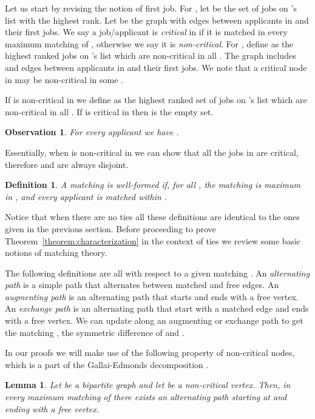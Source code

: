 \documentclass[11pt]{article}
\newtheorem{lemma}{Lemma}
\newtheorem{definition}{Definition}
\newtheorem{observation}{Observation}
\begin{document}
{Let us start by revising the notion of first job. For , let  be the set of jobs on 's list with the highest rank. Let  be the graph with edges between applicants in  and their first jobs. We say a job/applicant is \emph{critical} in  if it is matched in every maximum matching of , otherwise we say it is \emph{non-critical}. For , define  as the highest ranked jobs on 's list which are non-critical in all . The graph  includes  and edges between applicants in  and their first jobs. We note that a critical node in  may be non-critical in some .

If  is non-critical in  we define  as the highest ranked set of jobs on 's list which are non-critical in all . If  is critical in  then  is the empty set.

\begin{observation} For every applicant  we have .
\end{observation}

Essentially, when  is non-critical in  we can show that all the jobs in  are critical, therefore  and  are always disjoint.

\begin{definition}
A matching  is \emph{well-formed} if, for all , the matching  is maximum in , and every applicant  is matched within . 
\end{definition}

Notice that when there are no ties all these definitions are identical to the ones given in the previous section. Before proceeding to prove Theorem~\ref{theorem:characterization} in the context of ties we review some basic notions of matching theory.

The following definitions are all with respect to a given matching . An \emph{alternating path} is a simple path that alternates between matched and free edges. An \emph{augmenting path} is an alternating path that starts and ends with a free vertex. An \emph{exchange path} is an alternating path that start with a matched edge and ends with a free vertex. We can update  along an augmenting or exchange path  to get the matching , the symmetric difference of  and . 

In our proofs we will make use of the following property of non-critical nodes, which is a part of the Gallai-Edmonds decomposition \cite{S03}.

\begin{lemma} \label{lemma:critical} Let  be a bipartite graph and let  be a non-critical vertex. Then, in every maximum matching  of  there exists an alternating path starting at  and ending with a free vertex.
\end{lemma}

}
\end{document}
